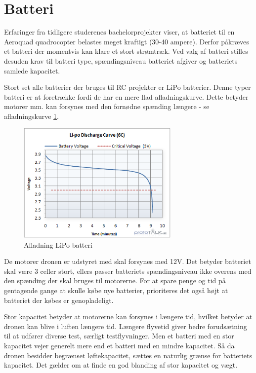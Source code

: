 \section{Batteri}

Erfaringer fra tidligere studerenes bachelorprojekter viser, at batteriet til en Aeroquad quadrocopter belastes meget kraftigt (30-40 ampere). Derfor påkræves et batteri der momentvis kan klare et stort strømtræk. Ved valg af batteri stilles desuden krav til batteri type, spændingsniveau batteriet afgiver og batteriets samlede kapacitet.

Stort set alle batterier der bruges til RC projekter er LiPo batterier. Denne typer batteri er at foretrække fordi de har en mere flad afladningskurve. Dette betyder motorer mm. kan forsynes med den fornødne spænding længere - se afladningskurve \ref{fig:lipo_discharge}.

\begin{figure}[H]
\centering
\includegraphics[width=0.7\textwidth]{Billeder/lipo_discharge_curve.png}
\caption{Afladning LiPo batteri}
\label{fig:lipo_discharge}
\end{figure}

De motorer dronen er udstyret med skal forsynes med 12V. Det betyder batteriet skal være 3 celler stort, ellers passer batteriets spændingsniveau ikke overens med den spænding der skal bruges til motorerne. For at spare penge og tid på gentagende gange at skulle købe nye batterier, prioriteres det også højt at batteriet der købes er genopladeligt. 

Stor kapacitet betyder at motorerne kan forsynes i længere tid, hvilket betyder at dronen kan blive i luften længere tid. Længere flyvetid giver bedre forudsætning til at udfører diverse test, særligt testflyvninger. Men et batteri med en stor kapacitet vejer generelt mere end et batteri med en mindre kapacitet. Så da dronen besidder begrænset løftekapacitet, sættes en naturlig grænse for batteriets kapacitet. Det gælder om at finde en god blanding af stor kapacitet og vægt. 
 
